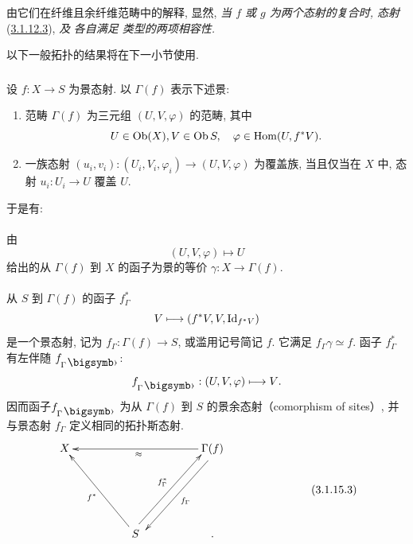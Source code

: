 由它们在纤维且余纤维范畴中的解释, 显然, \emph{当 $f$ 或 $g$ 为两个态射的复合时, 态射} (\hyperref[XVIII.cor3.1.12.3]{3.1.12.3}),  \emph{及}  \emph{各自满足  类型的两项相容性.}

以下一般拓扑的结果将在下一小节使用.

\subsubsection{}
设 $f:X\rightarrow S$ 为景态射. 以 $\Gamma(f)$ 表示下述景:
\begin{enumerate}
\renewcommand{\theenumi}{\alph{enumi}}
\renewcommand{\labelenumi}{\theenumi)}
\item 范畴 $\Gamma(f)$ 为三元组 $(U,V,\varphi)$ 的范畴, 其中
$$
U\in \operatorname{Ob} (X), V\in \operatorname{Ob} S,\quad \varphi\in \operatorname{Hom}
(U,f^{\ast}V){}.
$$

\item 一族态射 $(u_{i},v_{i}):(U_{i},V_{i},\varphi_{i})\rightarrow (U,V,\varphi)$ 为覆盖族, 当且仅当在 $X$ 中, 态射 $u_{i}:U_{i}\rightarrow U$ 覆盖 $U$.
\end{enumerate}

于是有:

\paragraph{}
由
$$
(U,V,\varphi)\longmapsto U
$$
给出的从 $\Gamma(f)$ 到 $X$ 的函子为景的等价 $\gamma:X\rightarrow \Gamma(f)$.

\paragraph{}
从 $S$ 到 $\Gamma(f)$ 的函子 $f^{\ast}_{\Gamma}$
$$
V\longmapsto (f^{\ast}V,V,\operatorname{Id}_{f^{\ast}V})
$$
是一个景态射, 记为 $f_{\Gamma}:\Gamma(f)\rightarrow S$, 或滥用记号简记 $f$. 它满足 $f_{\Gamma}\gamma\simeq f$. 函子 $f^{\ast}_{\Gamma}$ 有左伴随 $f_{\Gamma\bigdot}$:
$$
f_{\Gamma\bigdot}:(U,V,\varphi)\longmapsto V{\quoi}.
$$
因而函子\pageoriginale $f_{\Gamma\bigdot}$ 为从 $\Gamma(f)$ 到 $S$ 的景余态射（comorphism of sites）, 并与景态射 $f_{\Gamma}$ 定义相同的拓扑斯态射.
\begin{equation*}
\vcenter{
\xymatrix@R=2.2cm@C=1.75cm{
X &         &\Gamma(f) \ar[ll]^{\approx}
\ar@<4pt>[ld]^{f_{\Gamma}}& \\
  &    S \ar[lu]^{f^{\ast}}  \ar@<4pt>[ru]^{f^{\ast}_{\Gamma}} & .
}}\tag{3.1.15.3}
\end{equation*}

